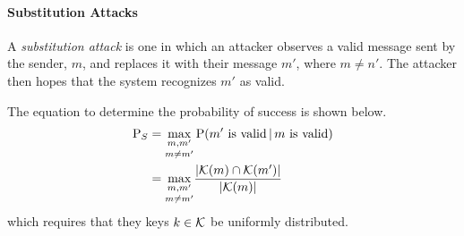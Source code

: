 \paragraph{Substitution Attacks}\label{par:Attack_Authentication_Code-Substitution}
\begin{definition}\label{def:Attack_Authentication_Code-Substitution}
  A \emph{substitution attack} is one in which an attacker observes a valid message sent by the sender, $m$, and replaces it with their message $m'$, where $m \neq n'$.
  The attacker then hopes that the system recognizes $m'$ as valid.

  The equation to determine the probability of success is shown below.
  \begin{equation}\label{eq:Attack_Authentication_Code-Substitution-Success}
    \begin{aligned}
      \operatorname{\operatorname{P}}_{S} &= \underset{m \neq m'}{\max_{m,m'}} \operatorname{\operatorname{P}}(m' \text{ is valid} \operatorname{\vert} m \text{ is valid}) \\
      &= \underset{m \neq m'}{\max_{m,m'}} \frac{\lvert \operatorname{\mathcal{K}}(m) \cap \operatorname{\mathcal{K}}(m') \rvert}{\lvert \operatorname{\mathcal{K}}(m) \rvert}
    \end{aligned}
  \end{equation}
  which requires that they keys $k \in \operatorname{\mathcal{K}}$ be uniformly distributed.
\end{definition}


